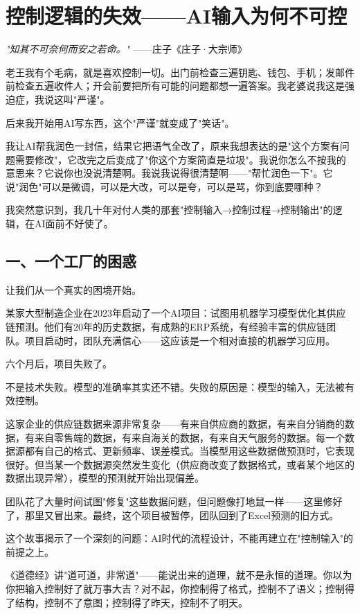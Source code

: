 \chapter{控制逻辑的失效——AI输入为何不可控}


\textit{"知其不可奈何而安之若命。"}
——庄子《庄子·大宗师》


老王我有个毛病，就是喜欢控制一切。出门前检查三遍钥匙、钱包、手机；发邮件前检查五遍收件人；开会前要把所有可能的问题都想一遍答案。我老婆说我这是强迫症，我说这叫"严谨"。

后来我开始用AI写东西，这个"严谨"就变成了"笑话"。

我让AI帮我润色一封信，结果它把语气全改了，原来我想表达的是"这个方案有问题需要修改"，它改完之后变成了"你这个方案简直是垃圾"。我说你怎么不按我的意思来？它说你也没说清楚啊。我说我说得很清楚啊——"帮忙润色一下"。它说"润色"可以是微调，可以是大改，可以是夸，可以是骂，你到底要哪种？

我突然意识到，我几十年对付人类的那套"控制输入→控制过程→控制输出"的逻辑，在AI面前不好使了。

\section{一、一个工厂的困惑}


让我们从一个真实的困境开始。

某家大型制造企业在2023年启动了一个AI项目：试图用机器学习模型优化其供应链预测。他们有20年的历史数据，有成熟的ERP系统，有经验丰富的供应链团队。项目启动时，团队充满信心——这应该是一个相对直接的机器学习应用。

六个月后，项目失败了。

不是技术失败。模型的准确率其实还不错。失败的原因是：模型的输入，无法被有效控制。

这家企业的供应链数据来源非常复杂——有来自供应商的数据，有来自分销商的数据，有来自零售端的数据，有来自海关的数据，有来自天气服务的数据。每一个数据源都有自己的格式、更新频率、误差模式。当模型用这些数据做预测时，它表现很好。但当某一个数据源突然发生变化（供应商改变了数据格式，或者某个地区的数据出现异常），模型的预测就开始出现偏差。

团队花了大量时间试图"修复"这些数据问题，但问题像打地鼠一样——这里修好了，那里又冒出来。最终，这个项目被暂停，团队回到了Excel预测的旧方式。

这个故事揭示了一个深刻的问题：AI时代的流程设计，不能再建立在"控制输入"的前提之上。

《道德经》讲"道可道，非常道"——能说出来的道理，就不是永恒的道理。你以为你把输入控制好了就万事大吉？对不起，你控制得了格式，控制不了语义；控制得了结构，控制不了意图；控制得了昨天，控制不了明天。

